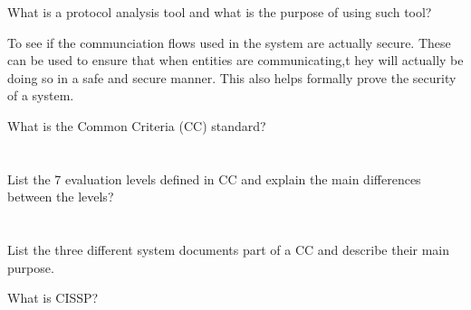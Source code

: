 \begin{questions}
\question{} What is a protocol analysis tool and what is the purpose of using such tool?
  \begin{solution}
    To see if the communciation flows used in the system are actually secure.
    These can be used to ensure that when entities are communicating,t hey will actually be doing so in a safe and secure manner.
    This also helps formally prove the security of a system.
  \end{solution}

\question{} What is the Common Criteria (CC) standard?
  \begin{parts}
  \part{} List the 7 evaluation levels defined in CC and explain the main differences between the levels?
  \part{} List the three different system documents part of a CC and describe their main purpose.
  \end{parts}

\question{} What is CISSP?\@
\end{questions}

